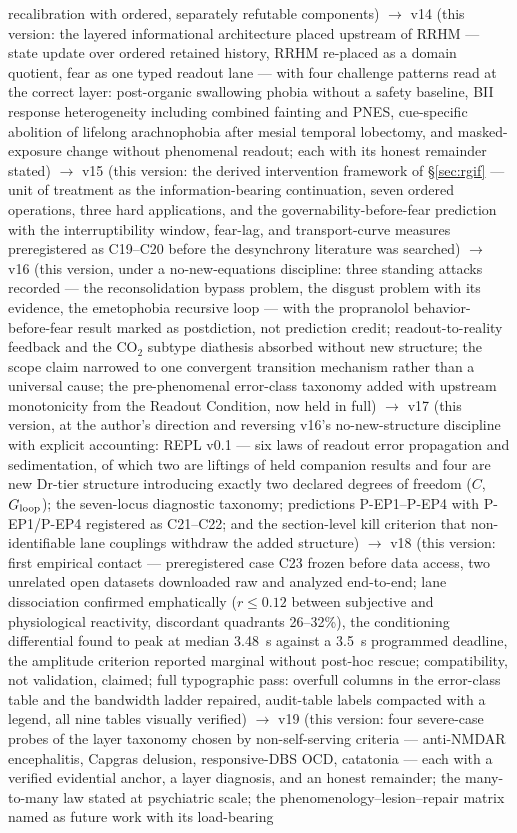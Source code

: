 \documentclass[9pt,twocolumn]{article}
\begin{document}
recalibration with ordered, separately refutable components) $\rightarrow$ v14 (this version: the layered informational architecture placed upstream of RRHM --- state update over ordered retained history, RRHM re-placed as a domain quotient, fear as one typed readout lane --- with four challenge patterns read at the correct layer: post-organic swallowing phobia without a safety baseline, BII response heterogeneity including combined fainting and PNES, cue-specific abolition of lifelong arachnophobia after mesial temporal lobectomy, and masked-exposure change without phenomenal readout; each with its honest remainder stated) $\rightarrow$ v15 (this version: the derived intervention framework of \S\ref{sec:rgif} --- unit of treatment as the information-bearing continuation, seven ordered operations, three hard applications, and the governability-before-fear prediction with the interruptibility window, fear-lag, and transport-curve measures preregistered as C19--C20 before the desynchrony literature was searched) $\rightarrow$ v16 (this version, under a no-new-equations discipline: three standing attacks recorded --- the reconsolidation bypass problem, the disgust problem with its evidence, the emetophobia recursive loop --- with the propranolol behavior-before-fear result marked as postdiction, not prediction credit; readout-to-reality feedback and the CO$_2$ subtype diathesis absorbed without new structure; the scope claim narrowed to one convergent transition mechanism rather than a universal cause; the pre-phenomenal error-class taxonomy added with upstream monotonicity from the Readout Condition, now held in full) $\rightarrow$ v17 (this version, at the author's direction and reversing v16's no-new-structure discipline with explicit accounting: REPL v0.1 --- six laws of readout error propagation and sedimentation, of which two are liftings of held companion results and four are new Dr-tier structure introducing exactly two declared degrees of freedom ($C$, $G_{\rm loop}$); the seven-locus diagnostic taxonomy; predictions P-EP1--P-EP4 with P-EP1/P-EP4 registered as C21--C22; and the section-level kill criterion that non-identifiable lane couplings withdraw the added structure) $\rightarrow$ v18 (this version: first empirical contact --- preregistered case C23 frozen before data access, two unrelated open datasets downloaded raw and analyzed end-to-end; lane dissociation confirmed emphatically ($r\le0.12$ between subjective and physiological reactivity, discordant quadrants 26--32\%), the conditioning differential found to peak at median 3.48~s against a 3.5~s programmed deadline, the amplitude criterion reported marginal without post-hoc rescue; compatibility, not validation, claimed; full typographic pass: overfull columns in the error-class table and the bandwidth ladder repaired, audit-table labels compacted with a legend, all nine tables visually verified) $\rightarrow$ v19 (this version: four severe-case probes of the layer taxonomy chosen by non-self-serving criteria --- anti-NMDAR encephalitis, Capgras delusion, responsive-DBS OCD, catatonia --- each with a verified evidential anchor, a layer diagnosis, and an honest remainder; the many-to-many law stated at psychiatric scale; the phenomenology--lesion--repair matrix named as future work with its load-bearing 
\end{document}

